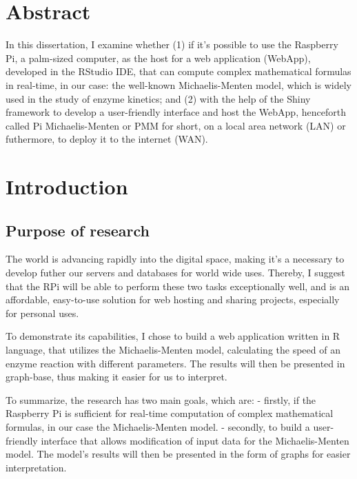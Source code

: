 \newpage

\hypertarget{abstract}{%
\section{Abstract}\label{abstract}}

In this dissertation, I examine whether (1) if it's possible to use the
Raspberry Pi, a palm-sized computer, as the host for a web application
(WebApp), developed in the RStudio IDE, that can compute complex
mathematical formulas in real-time, in our case: the well-known
Michaelis-Menten model, which is widely used in the study of enzyme
kinetics; and (2) with the help of the Shiny framework to develop a
user-friendly interface and host the WebApp, henceforth called Pi
Michaelis-Menten or PMM for short, on a local area network (LAN) or
futhermore, to deploy it to the internet (WAN).

\hypertarget{introduction}{%
\section{Introduction}\label{introduction}}

\hypertarget{purpose-of-research}{%
\subsection{Purpose of research}\label{purpose-of-research}}

The world is advancing rapidly into the digital space, making it's a
necessary to develop futher our servers and databases for world wide
uses. Thereby, I suggest that the RPi will be able to perform these two
tasks exceptionally well, and is an affordable, easy-to-use solution for
web hosting and sharing projects, especially for personal uses.

To demonstrate its capabilities, I chose to build a web application
written in R language, that utilizes the Michaelis-Menten model,
calculating the speed of an enzyme reaction with different parameters.
The results will then be presented in graph-base, thus making it easier
for us to interpret.

To summarize, the research has two main goals, which are: - firstly, if
the Raspberry Pi is sufficient for real-time computation of complex
mathematical formulas, in our case the Michaelis-Menten model. -
secondly, to build a user-friendly interface that allows modification of
input data for the Michaelis-Menten model. The model's results will then
be presented in the form of graphs for easier interpretation.

